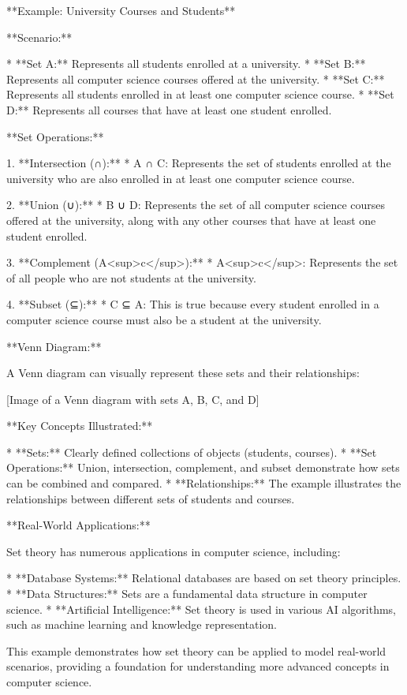 **Example: University Courses and Students**

**Scenario:**

* **Set A:** Represents all students enrolled at a university.
* **Set B:** Represents all computer science courses offered at the university.
* **Set C:** Represents all students enrolled in at least one computer science course. 
* **Set D:** Represents all courses that have at least one student enrolled.

**Set Operations:**

1. **Intersection (∩):**
    * A ∩ C: Represents the set of students enrolled at the university who are also enrolled in at least one computer science course.

2. **Union (∪):**
    * B ∪ D: Represents the set of all computer science courses offered at the university, along with any other courses that have at least one student enrolled.

3. **Complement (A<sup>c</sup>):**
    * A<sup>c</sup>: Represents the set of all people who are not students at the university.

4. **Subset (⊆):**
    * C ⊆ A: This is true because every student enrolled in a computer science course must also be a student at the university.

**Venn Diagram:**

A Venn diagram can visually represent these sets and their relationships:

[Image of a Venn diagram with sets A, B, C, and D]

**Key Concepts Illustrated:**

* **Sets:** Clearly defined collections of objects (students, courses).
* **Set Operations:** Union, intersection, complement, and subset demonstrate how sets can be combined and compared.
* **Relationships:** The example illustrates the relationships between different sets of students and courses.

**Real-World Applications:**

Set theory has numerous applications in computer science, including:

* **Database Systems:** Relational databases are based on set theory principles.
* **Data Structures:** Sets are a fundamental data structure in computer science.
* **Artificial Intelligence:** Set theory is used in various AI algorithms, such as machine learning and knowledge representation.

This example demonstrates how set theory can be applied to model real-world scenarios, providing a foundation for understanding more advanced concepts in computer science.
